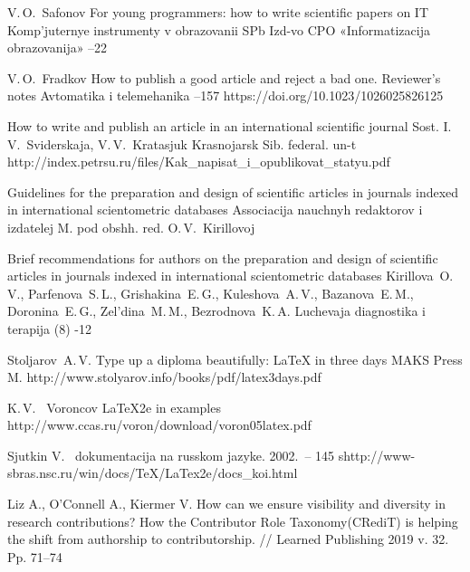 \documentclass{psta}%
\begin{document}
\maketitle
\begin{thebibliography}{9}


\by V.\,O.~Safonov
\paper For young programmers: how to write scientific papers on IT
\jour Komp'juternye instrumenty v obrazovanii
\publaddr SPb
\publ Izd-vo CPO «Informatizacija obrazovanija»
--22

\by V.\,O.~Fradkov
\paper How to publish a good article and reject a bad one. Reviewer's notes
\jour Avtomatika i telemehanika
--157
\doi https://doi.org/10.1023/1026025826125

\eprint How to write and publish an article in an international scientific journal
\eprintinfo Sost. I.\,V.~Sviderskaja, V.\,V.~Kratasjuk
\publaddr Krasnojarsk
\publ Sib. federal. un-t
\URL http://index.petrsu.ru/files/Kak_napisat_i_opublikovat_statyu.pdf

\eprint Guidelines for the preparation and design of scientific articles in journals indexed in international scientometric databases
\publ Associacija nauchnyh redaktorov i izdatelej
\publaddr M.
\eprintinfo pod obshh. red.  O.\,V.~Kirillovoj

\paper Brief recommendations for authors on the preparation and design of scientific articles in journals indexed in international scientometric databases
\by Kirillova~O.\,V., Parfenova~S.\,L., Grishakina~E.\,G., Kuleshova~A.\,V., Bazanova~E.\,M., Doronina~E.\,G., Zel'dina~M.\,M., Bezrodnova~K.\,A.
\jour Luchevaja diagnostika i terapija
(8)
-12

\by Stoljarov~A.\,V.
\book Type up a diploma beautifully: LaTeX in three days
\publ MAKS Press
\publaddr M.
\URL http://www.stolyarov.info/books/pdf/latex3days.pdf

\by K.\,V.~ Voroncov
\eprint LaTeX2e in examples
\URL http://www.ccas.ru/voron/download/voron05latex.pdf

    Sjutkin V. \LaTeXe\ dokumentacija na russkom jazyke. 2002.~\--- 145 s\URL http://www-sbras.nsc.ru/win/docs/TeX/LaTex2e/docs_koi.html

 Liz A., O’Connell A., Kiermer V. How can we ensure visibility and diversity in research contributions? How the Contributor Role Taxonomy(CRediT) is helping the shift from authorship to contributorship. // Learned Publishing 2019 v. 32. Pp. 71–74 

\end{thebibliography}
\end{document}
